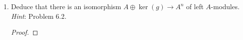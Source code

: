\documentclass[../psets.tex]{subfiles}
\begin{document}
\begin{enumerate}
\begin{enumerate}
\begin{proof}


            Since $A=c_1A+\cdots+c_nA$ by hypothesis, there exist $v_1,\dots,v_n\in A$ such that $1=c_1v_1+\cdots+c_nv_n$. Define $g:A^n\to A$ by
            \begin{equation*}
                g(a_1,\dots,a_n) = a_1v_1+\cdots+a_nv_n
            \end{equation*}
            Since $A$ is an $A$-module and $g$ is of the form specified in class (and in the statement of Problem 6.6), we know that $g$ is a left $A$-module homomorphism. Moreover, we have that
            \begin{equation*}
                g(c) = g(c_1,\dots,c_n)
                = c_1v_1+\cdots+c_nv_n
                = 1
            \end{equation*}
            as desired.
        \end{proof}
        \item Deduce that there is an isomorphism $A\oplus\ker(g)\to A^n$ of left $A$-modules. \emph{Hint}: Problem 6.2.
        \begin{proof}


\end{proof}
\end{enumerate}
\end{enumerate}
\end{document}
